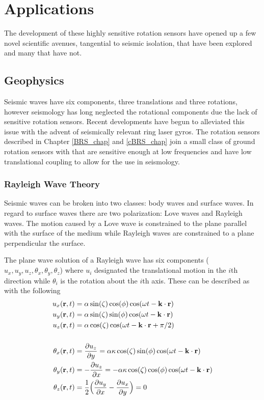 \documentclass [12pt, proquest]{uwthesis}[2019]
\begin{document}
\chapter{Applications}
\quad The development of these highly sensitive rotation sensors have opened up a few novel scientific avenues, tangential to seismic isolation, that have been explored and many that have not.

\section{Geophysics}
Seismic waves have six components, three translations and three rotations, however seismology has long neglected the rotational components due the lack of sensitive rotation sensors. Recent developments have begun to alleviated this issue with the advent of seismically relevant ring laser gyros. \cite{ring} The rotation sensors described in Chapter \ref{BRS_chap} and \ref{cBRS_chap} join a small class of ground rotation sensors with that are sensitive enough at low frequencies and have low translational coupling to allow for the use in seismology.
\subsection{Rayleigh Wave Theory}

Seismic waves can be broken into two classes: body waves and surface waves. In regard to surface waves there are two polarization: Love waves and Rayleigh waves. The motion caused by a Love wave is constrained to the plane parallel with the surface of the medium while Rayleigh waves are constrained to a plane perpendicular the surface. 

The plane wave solution of a Rayleigh wave has six components ($u_x, u_y, u_z, \theta_x, \theta_y, \theta_z$) where $u_i$ designated the translational motion in the $i$th direction while $\theta_i$ is the rotation about the $i$th axis.
These can be described as with the following \cite{seismic}
\begin{align}
u_x({\bf r} ,t)&=\alpha \sin(\zeta) \cos(\phi) \cos(\omega t-{\bf k}\cdot{\bf r})\label{XEq}\\
u_y({\bf r} ,t)&=\alpha \sin(\zeta) \sin(\phi) \cos(\omega t-{\bf k}\cdot{\bf r})\\
u_z({\bf r} ,t)&=\alpha \cos(\zeta) \cos(\omega t-{\bf k}\cdot{\bf r}+\pi/2)\label{ZEq}\\
\notag \\
\theta_x({\bf r} ,t)&=\frac{\partial u_z}{\partial y}=\alpha \kappa \cos(\zeta) \sin(\phi) \cos(\omega t-{\bf k}\cdot{\bf r})\label{TiltXEq}\\
\theta_y({\bf r} ,t)&=-\frac{\partial u_z}{\partial x}=-\alpha \kappa \cos(\zeta) \cos(\phi) \cos(\omega t-{\bf k}\cdot{\bf r})\\
\theta_z({\bf r} ,t)&=\frac{1}{2}\Big(\frac{\partial u_y}{\partial x}-\frac{\partial u_x}{\partial y}\Big)=0
\end{align}
\end{document}
